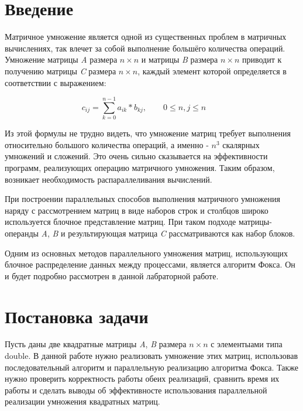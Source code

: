 \documentclass{report}
\begin{document}
\setcounter{page}{2}

\tableofcontents
\newpage

\section*{Введение}
Матричное умножение является одной из существенных проблем в матричных
вычислениях, так влечет за собой выполнение большёго количества операций. Умножение матрицы {\itshape A} размера {\itshape $n \times n$} и матрицы {\itshape B} размера {\itshape $n \times n$} приводит к получению матрицы {\itshape C} размера {\itshape $n \times n$}, каждый элемент которой определяется в соответствии с выражением:
\par$$
    c_{ij} = \sum_{k=0}^{n-1} a_{ik} * b_{kj},\qquad 0 \le n,j \le n \qquad
    $$

Из этой формулы не трудно видеть, что умножение матриц требует выполнения относительно большого количества операций, а именно - $n^3$ скалярных умножений и сложений. Это очень сильно сказывается на эффективности программ, реализующих операцию матричного умножения. Таким образом, возникает необходимость распараллеливания вычислений.
\par При построении параллельных способов выполнения матричного умножения наряду с
рассмотрением матриц в виде наборов строк и столбцов широко используется блочное
представление матриц. При таком подходе матрицы-операнды {\itshape A}, {\itshape B} и результирующая
матрица {\itshape C} рассматриваются как набор блоков. 
\par Одним из основных методов параллельного умножения матриц, использующих блочное
распределение данных между процессами, является алгоритм Фокса. Он и будет подробно
рассмотрен в данной лабраторной работе.

\newpage

\section*{Постановка задачи}
Пусть даны две квадратные матрицы {\itshape A}, {\itshape B} размера {\itshape $n \times n$} с элементыами типа double. В данной работе нужно реализовать умножение этих матриц, использовав последовательный алгоритм и параллельную реализацию алгоритма Фокса. Также нужно проверить корректность работы обеих реализаций, сравнить время их работы и сделать выводы об эффективносте использования параллельной реализации умножения квадратных матриц.
\end{document}
